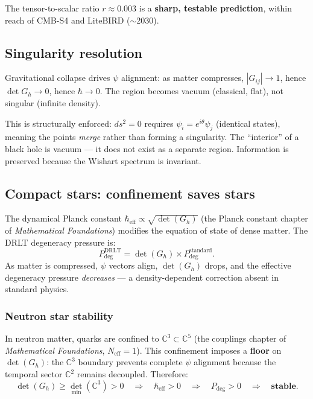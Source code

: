\documentclass[12pt]{article}
\theoremstyle{remark}
\theoremstyle{definition}
\newcommand{\CC}{\mathbb{C}}
\begin{document}
The tensor-to-scalar ratio $r \approx 0.003$ is a \textbf{sharp, testable prediction}, within reach of CMB-S4 and LiteBIRD ($\sim$2030).

\subsection{Singularity resolution}

Gravitational collapse drives $\psi$ alignment: as matter compresses, $|G_{ij}| \to 1$, hence $\det G_h \to 0$, hence $\hbar \to 0$. The region becomes vacuum (classical, flat), not singular (infinite density).

This is structurally enforced: $ds^2 = 0$ requires $\psi_i = e^{i\theta}\psi_j$ (identical states), meaning the points \emph{merge} rather than forming a singularity. The ``interior'' of a black hole is vacuum --- it does not exist as a separate region. Information is preserved because the Wishart spectrum is invariant.

\subsection{Compact stars: confinement saves stars}

The dynamical Planck constant $\hbar_\text{eff} \propto \sqrt{\det(G_h)}$ (the Planck constant chapter of \textit{Mathematical Foundations}) modifies the equation of state of dense matter. The DRLT degeneracy pressure is:
\begin{equation}
P_\text{deg}^\text{DRLT} = \det(G_h) \times P_\text{deg}^\text{standard}.
\end{equation}
As matter is compressed, $\psi$ vectors align, $\det(G_h)$ drops, and the effective degeneracy pressure \emph{decreases} --- a density-dependent correction absent in standard physics.

\subsubsection{Neutron star stability}

In neutron matter, quarks are confined to $\CC^3 \subset \CC^5$ (the couplings chapter of \textit{Mathematical Foundations}, $N_\text{eff} = 1$). This confinement imposes a \textbf{floor} on $\det(G_h)$: the $\CC^3$ boundary prevents complete $\psi$ alignment because the temporal sector $\CC^2$ remains decoupled. Therefore:
\begin{equation}
\det(G_h) \geq \det_\text{min}(\CC^3) > 0 \quad\Rightarrow\quad \hbar_\text{eff} > 0 \quad\Rightarrow\quad P_\text{deg} > 0 \quad\Rightarrow\quad \textbf{stable.}
\end{equation}
\end{document}
